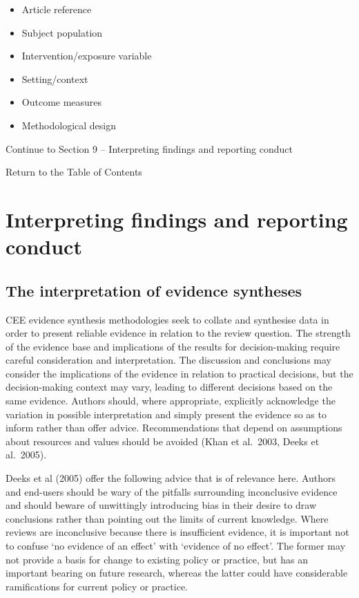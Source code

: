 \documentclass[
  letterpaper,
  DIV=11,
  numbers=noendperiod]{scrreprt}
\begin{document}
\begin{itemize}
\item
  Article reference
\item
  Subject population
\item
  Intervention/exposure variable
\item
  Setting/context
\item
  Outcome measures
\item
  Methodological design
\end{itemize}

Continue to Section 9 -- Interpreting findings and reporting conduct

Return to the Table of Contents


\chapter{Interpreting findings and reporting conduct}\label{sec-chapt9}

\section{\texorpdfstring{\textbf{The interpretation of evidence
syntheses}}{The interpretation of evidence syntheses}}\label{the-interpretation-of-evidence-syntheses}

CEE evidence synthesis methodologies seek to collate and synthesise data
in order to present reliable evidence in relation to the review
question. The strength of the evidence base and implications of the
results for decision-making require careful consideration and
interpretation. The discussion and conclusions may consider the
implications of the evidence in relation to practical decisions, but the
decision-making context may vary, leading to different decisions based
on the same evidence. Authors should, where appropriate, explicitly
acknowledge the variation in possible interpretation and simply present
the evidence so as to inform rather than offer advice. Recommendations
that depend on assumptions about resources and values should be avoided
(Khan et al.~2003, Deeks et al.~2005).

Deeks et al (2005) offer the following advice that is of relevance here.
Authors and end-users should be wary of the pitfalls surrounding
inconclusive evidence and should beware of unwittingly introducing bias
in their desire to draw conclusions rather than pointing out the limits
of current knowledge. Where reviews are inconclusive because there is
insufficient evidence, it is important not to confuse `no evidence of an
effect' with `evidence of no effect'. The former may not provide a basis
for change to existing policy or practice, but has an important bearing
on future research, whereas the latter could have considerable
ramifications for current policy or practice.
\end{document}
